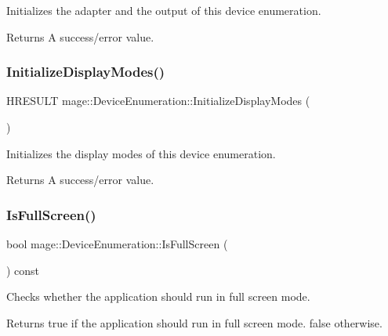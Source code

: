 Initializes the adapter and the output of this device enumeration.

\begin{DoxyReturn}{Returns}
A success/error value. 
\end{DoxyReturn}
\hypertarget{classmage_1_1_device_enumeration_ac4644c68492b919362e21f2e47fbad93}{}\label{classmage_1_1_device_enumeration_ac4644c68492b919362e21f2e47fbad93} 
\subsubsection{\texorpdfstring{Initialize\+Display\+Modes()}{InitializeDisplayModes()}}
{\footnotesize\ttfamily H\+R\+E\+S\+U\+LT mage\+::\+Device\+Enumeration\+::\+Initialize\+Display\+Modes (\begin{DoxyParamCaption}{ }\end{DoxyParamCaption})\hspace{0.3cm}{\ttfamily [private]}}

Initializes the display modes of this device enumeration.

\begin{DoxyReturn}{Returns}
A success/error value. 
\end{DoxyReturn}
\hypertarget{classmage_1_1_device_enumeration_a8957ecacc567708e80694b25aa141c4e}{}\label{classmage_1_1_device_enumeration_a8957ecacc567708e80694b25aa141c4e} 
\subsubsection{\texorpdfstring{Is\+Full\+Screen()}{IsFullScreen()}}
{\footnotesize\ttfamily bool mage\+::\+Device\+Enumeration\+::\+Is\+Full\+Screen (\begin{DoxyParamCaption}{ }\end{DoxyParamCaption}) const}

Checks whether the application should run in full screen mode.

\begin{DoxyReturn}{Returns}
{\ttfamily true} if the application should run in full screen mode. {\ttfamily false} otherwise. 
\end{DoxyReturn}
\hypertarget{classmage_1_1_device_enumeration_a035e2430142e4e4ffcbc712f83e1e7e0}{}\label{classmage_1_1_device_enumeration_a035e2430142e4e4ffcbc712f83e1e7e0} 
